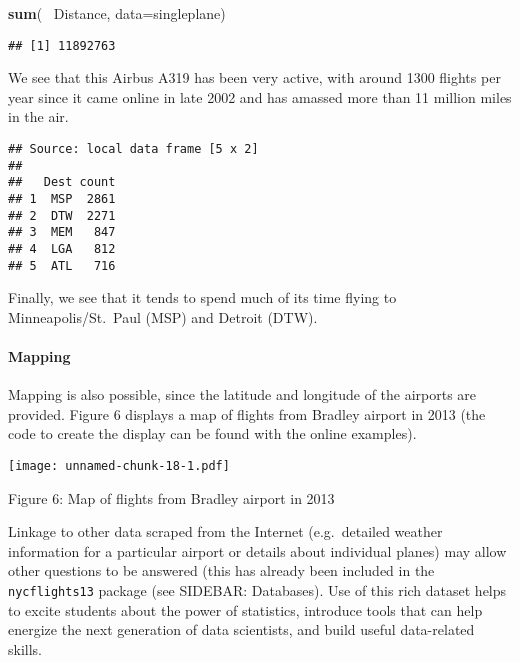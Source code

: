 \documentclass[]{article}
\newenvironment{Shaded}{\begin{snugshade}}{\end{snugshade}}
\newcommand{\KeywordTok}[1]{\textcolor[rgb]{0.13,0.29,0.53}{\textbf{{#1}}}}
\newcommand{\DataTypeTok}[1]{\textcolor[rgb]{0.13,0.29,0.53}{{#1}}}
\newcommand{\DecValTok}[1]{\textcolor[rgb]{0.00,0.00,0.81}{{#1}}}
\newcommand{\StringTok}[1]{\textcolor[rgb]{0.31,0.60,0.02}{{#1}}}
\newcommand{\NormalTok}[1]{{#1}}
\begin{document}
\begin{Shaded}
\begin{Highlighting}[]
\KeywordTok{sum}\NormalTok{(~}\StringTok{ }\NormalTok{Distance, }\DataTypeTok{data=}\NormalTok{singleplane)}
\end{Highlighting}
\end{Shaded}

\begin{verbatim}
## [1] 11892763
\end{verbatim}

We see that this Airbus A319 has been very active, with around 1300
flights per year since it came online in late 2002 and has amassed more
than 11 million miles in the air.

\begin{Shaded}
\end{Shaded}

\begin{verbatim}
## Source: local data frame [5 x 2]
## 
##   Dest count
## 1  MSP  2861
## 2  DTW  2271
## 3  MEM   847
## 4  LGA   812
## 5  ATL   716
\end{verbatim}

Finally, we see that it tends to spend much of its time flying to
Minneapolis/St.~Paul (MSP) and Detroit (DTW).

\paragraph{Mapping}\label{mapping}

Mapping is also possible, since the latitude and longitude of the
airports are provided. Figure 6 displays a map of flights from Bradley
airport in 2013 (the code to create the display can be found with the
online examples).

\texttt{[image: unnamed-chunk-18-1.pdf]}

Figure 6: Map of flights from Bradley airport in 2013

Linkage to other data scraped from the Internet (e.g.~detailed weather
information for a particular airport or details about individual planes)
may allow other questions to be answered (this has already been included
in the \texttt{nycflights13} package (see SIDEBAR: Databases). Use of
this rich dataset helps to excite students about the power of
statistics, introduce tools that can help energize the next generation
of data scientists, and build useful data-related skills.
\end{document}
